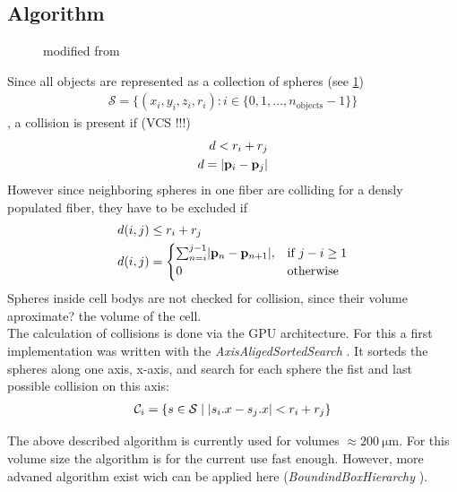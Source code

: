 \subsection{Algorithm}
% 
\begin{figure}[!t]
\centering
\def\tikzwidth{0.75\textwidth}
\caption{modified from \cite{Ginsburger2019}}
\label{fig:model:medusa_4}
\end{figure}
%
% 
Since all objects are represented as a collection of spheres (see \cref{fig:model:medusa_4})
\begin{align}
    \mathcal{S} = \{ (x_i,y_i,z_i,r_i) : i \in \{0, 1, ..., n_\text{objects}-1\}  \} 
\end{align}
% 
, a collision is present if (VCS !!!)
% 
\begin{align}
\begin{split}
d<r_i+r_j\\
d = \lvert\mathbf{p}_i - \mathbf{p}_j\rvert
\end{split}
\end{align}
% 
However since neighboring spheres in one fiber are colliding for a densly populated fiber, they have to be excluded if
\begin{align}
\begin{split}
d(i,j) &\leq  r_i + r_j\\
d(i,j) &= 
\begin{cases}
\sum_{n=i}^{j-1} \lvert\mathbf{p}_n - \mathbf{p}_{n+1}\rvert,& \text{if } j-i \geq 1\\
0 & \text{otherwise}
\end{cases}
\end{split}
\end{align}
% 
Spheres inside cell bodys are not checked for collision, since their volume aproximate? the volume of the cell.\\
% 
The calculation of collisions is done via the GPU architecture. For this a first implementation was written with the \textit{AxisAligedSortedSearch} \cite{Karras2012}. It sorteds the spheres along one axis, \eg x-axis, and search for each sphere the fist and last possible collision on this axis:
\begin{align}
\begin{split}
\mathcal{C}_i = \{ s \in \mathcal{S} \mid \lvert s_i.x - s_j.x\rvert < r_i+r_j \}
\end{split}
\end{align}
% 
\begin{lstfloat}[!t]
	
	\caption{Pseudocode of \acs{MEDUSA} collision checking.}
	\label{alg:medusa_collision}
\end{lstfloat}
% 
The above described algorithm is currently used for volumes $\approx \SI{200}{\micro\meter}$. For this volume size the algorithm is for the current use fast enough. However, more advaned algorithm exist wich can be applied here (\eg \textit{BoundindBoxHierarchy} \cite{Karras2012}).
% 
